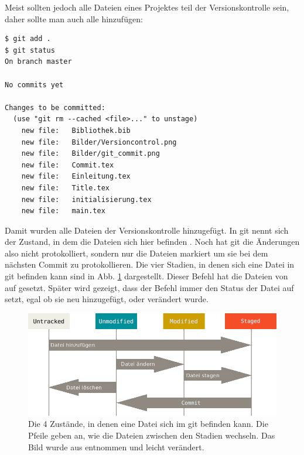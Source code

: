 Meist sollten jedoch alle Dateien eines Projektes teil der Versionskontrolle sein, daher sollte man auch alle hinzufügen:
\begin{lstlisting}
$ git add .
$ git status
On branch master

No commits yet

Changes to be committed:
  (use "git rm --cached <file>..." to unstage)
	new file:   Bibliothek.bib
	new file:   Bilder/Versioncontrol.png
	new file:   Bilder/git_commit.png
	new file:   Commit.tex
	new file:   Einleitung.tex
	new file:   Title.tex
	new file:   initialisierung.tex
	new file:   main.tex

\end{lstlisting}
Damit wurden alle Dateien der Versionskontrolle hinzugefügt. In git nennt sich der Zustand, in dem die Dateien sich hier befinden . Noch hat git die Änderungen also nicht protokolliert, sondern nur die Dateien markiert um sie bei dem nächsten Commit zu protokollieren. Die vier Stadien, in denen sich eine Datei in git befinden kann sind in Abb. \ref{fig:lifecycle} dargestellt. Dieser  Befehl hat die Dateien von  auf  gesetzt. Später wird gezeigt, dass der Befehl  immer den Status der Datei auf  setzt, egal ob sie neu hinzugefügt, oder verändert wurde.
\begin{figure}[!h]
    \centering
    \includegraphics[width=\textwidth]{Bilder/lifecycle_de.png}
    \caption{Die 4 Zustände, in denen eine Datei sich im git befinden kann. Die Pfeile geben an, wie die Dateien zwischen den Stadien wechseln. Das Bild wurde aus \cite{ProGit} entnommen und leicht verändert.}
    \label{fig:lifecycle}
\end{figure}
